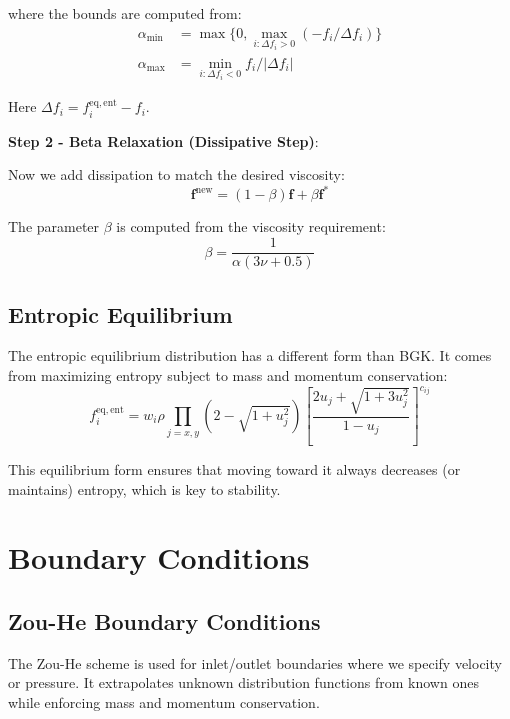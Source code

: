 where the bounds are computed from:
\begin{align}
\alpha_{\min} &= \max\{0, \max_{i:\Delta f_i > 0} (-f_i/\Delta f_i)\} \\
\alpha_{\max} &= \min_{i:\Delta f_i < 0} f_i/|\Delta f_i|
\end{align}

Here $\Delta f_i = f_i^{\mathrm{eq,ent}} - f_i$.

\textbf{Step 2 - Beta Relaxation (Dissipative Step)}:

Now we add dissipation to match the desired viscosity:
\begin{equation}
\mathbf{f}^{\mathrm{new}} = (1-\beta)\mathbf{f} + \beta \mathbf{f}^*
\end{equation}

The parameter $\beta$ is computed from the viscosity requirement:
\begin{equation}
\beta = \frac{1}{\alpha(3\nu + 0.5)}
\end{equation}

\subsection{Entropic Equilibrium}

The entropic equilibrium distribution has a different form than BGK. It comes from maximizing entropy subject to mass and momentum conservation:
\begin{equation}
f_i^{\mathrm{eq,ent}} = w_i \rho \prod_{j=x,y} \left(2 - \sqrt{1 + u_j^2}\right) \left[\frac{2u_j + \sqrt{1 + 3u_j^2}}{1 - u_j}\right]^{c_{ij}}
\end{equation}

This equilibrium form ensures that moving toward it always decreases (or maintains) entropy, which is key to stability.

\section{Boundary Conditions}

\subsection{Zou-He Boundary Conditions}

The Zou-He scheme \citep{zou1997} is used for inlet/outlet boundaries where we specify velocity or pressure. It extrapolates unknown distribution functions from known ones while enforcing mass and momentum conservation.

